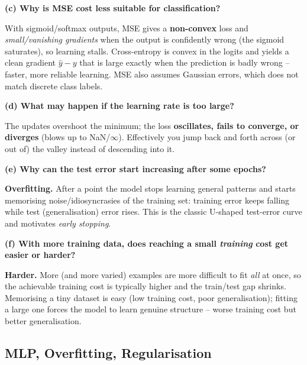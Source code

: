 \documentclass[10pt,a4paper]{article}
\begin{document}
\begin{enumerate}[leftmargin=*,label=\textbf{Q\arabic*.}]
\textbf{(c) Why is MSE cost less suitable for classification?}
\begin{answerbox}
With sigmoid/softmax outputs, MSE gives a \textbf{non-convex} loss and \emph{small/vanishing gradients} when the output is confidently wrong (the sigmoid saturates), so learning stalls. Cross-entropy is convex in the logits and yields a clean gradient $\hat y - y$ that is large exactly when the prediction is badly wrong -- faster, more reliable learning. MSE also assumes Gaussian errors, which does not match discrete class labels.
\end{answerbox}

\textbf{(d) What may happen if the learning rate is too large?}
\begin{answerbox}
The updates overshoot the minimum; the loss \textbf{oscillates, fails to converge, or diverges} (blows up to NaN/$\infty$). Effectively you jump back and forth across (or out of) the valley instead of descending into it.
\end{answerbox}

\textbf{(e) Why can the test error start increasing after some epochs?}
\begin{answerbox}
\textbf{Overfitting.} After a point the model stops learning general patterns and starts memorising noise/idiosyncrasies of the training set: training error keeps falling while test (generalisation) error rises. This is the classic U-shaped test-error curve and motivates \emph{early stopping}.
\end{answerbox}

\textbf{(f) With more training data, does reaching a small \emph{training} cost get easier or harder?}
\begin{answerbox}
\textbf{Harder.} More (and more varied) examples are more difficult to fit \emph{all} at once, so the achievable training cost is typically higher and the train/test gap shrinks. Memorising a tiny dataset is easy (low training cost, poor generalisation); fitting a large one forces the model to learn genuine structure -- worse training cost but better generalisation.
\end{answerbox}

\end{enumerate}

\subsection{MLP, Overfitting, Regularisation}
\end{document}
